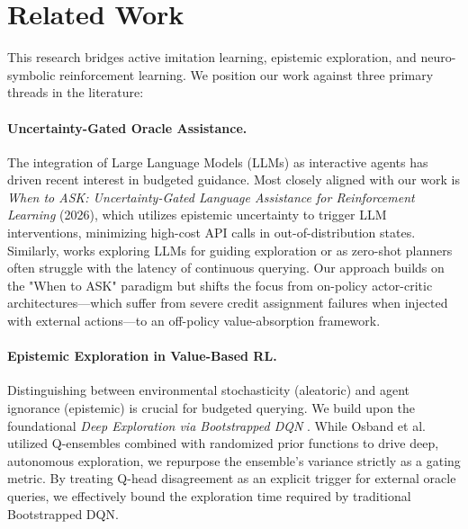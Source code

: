 \documentclass[11pt, a4paper]{article}
\begin{document}
\section{Related Work}

This research bridges active imitation learning, epistemic exploration, and neuro-symbolic reinforcement learning. We position our work against three primary threads in the literature:

\paragraph{Uncertainty-Gated Oracle Assistance.} 
The integration of Large Language Models (LLMs) as interactive agents has driven recent interest in budgeted guidance. Most closely aligned with our work is \textit{When to ASK: Uncertainty-Gated Language Assistance for Reinforcement Learning} (2026), which utilizes epistemic uncertainty to trigger LLM interventions, minimizing high-cost API calls in out-of-distribution states. Similarly, works exploring LLMs for guiding exploration \citep{du2023guiding} or as zero-shot planners \citep{huang2022language, ichter2023do} often struggle with the latency of continuous querying. Our approach builds on the "When to ASK" paradigm but shifts the focus from on-policy actor-critic architectures---which suffer from severe credit assignment failures when injected with external actions---to an off-policy value-absorption framework.

\paragraph{Epistemic Exploration in Value-Based RL.}
Distinguishing between environmental stochasticity (aleatoric) and agent ignorance (epistemic) is crucial for budgeted querying. We build upon the foundational \textit{Deep Exploration via Bootstrapped DQN} \citep{osband2016deep}. While Osband et al. utilized Q-ensembles combined with randomized prior functions to drive deep, autonomous exploration, we repurpose the ensemble's variance strictly as a gating metric. By treating Q-head disagreement as an explicit trigger for external oracle queries, we effectively bound the exploration time required by traditional Bootstrapped DQN.
\end{document}
